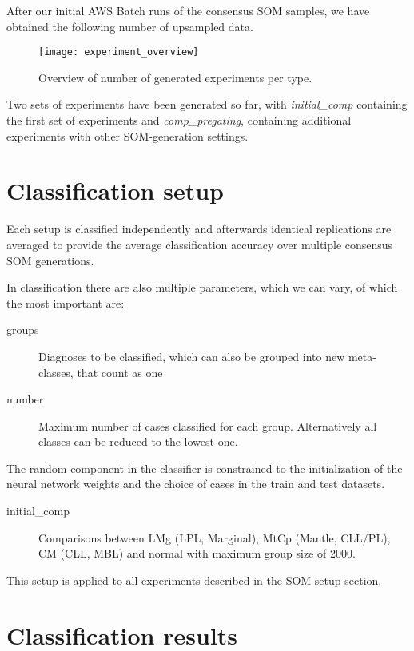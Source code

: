 \documentclass[11pt,a4paper]{article}
\begin{document}
After our initial AWS Batch runs of the consensus SOM samples, we have obtained the following number of upsampled data.

\begin{figure}[h]
   \centering
   \texttt{[image: experiment\_overview]}
   \caption{Overview of number of generated experiments per type.}
\end{figure}

Two sets of experiments have been generated so far, with \emph{initial\_comp} containing the first set of experiments and \emph{comp\_pregating}, containing additional experiments with other SOM-generation settings.


\section{Classification setup}

Each setup is classified independently and afterwards identical replications are averaged to provide the average classification
accuracy over multiple consensus SOM generations.

In classification there are also multiple parameters, which we can vary, of which the most important are:

\begin{description}
   \item[groups] Diagnoses to be classified, which can also be grouped into new meta-classes, that count as one
   \item[number] Maximum number of cases classified for each group. Alternatively all classes can be reduced to the lowest one.
\end{description}

The random component in the classifier is constrained to the initialization of the neural network weights and the choice of cases in the train and test datasets.

\begin{description}
   \item[initial\_comp] Comparisons between LMg (LPL, Marginal), MtCp (Mantle, CLL/PL), CM (CLL, MBL) and normal with maximum group size of 2000.
\end{description}

This setup is applied to all experiments described in the SOM setup section.


\section{Classification results}
\end{document}

